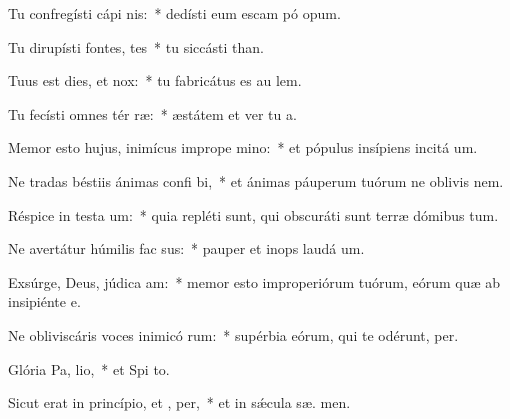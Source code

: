 \item Tu confregísti cápi nis:~* dedísti eum escam pó opum.
\item Tu dirupísti fontes,  tes~* tu siccásti  than.
\item Tuus est dies, et   nox:~* tu fabricátus es au  lem.
\item Tu fecísti omnes tér ræ:~* æstátem et ver tu  a.
\item Memor esto hujus, inimícus imprope mino:~* et pópulus insípiens incitá  um.
\item Ne tradas béstiis ánimas confi bi,~* et ánimas páuperum tuórum ne oblivis  nem.
\item Réspice in testa um:~* quia repléti sunt, qui obscuráti sunt terræ dómibus tum.
\item Ne avertátur húmilis fac sus:~* pauper et inops laudá  um.
\item Exsúrge, Deus, júdica  am:~* memor esto improperiórum tuórum, eórum quæ ab insipiénte   e.
\item Ne obliviscáris voces inimicó rum:~* supérbia eórum, qui te odérunt,  per.
\item Glória Pa,  lio,~* et Spi to.
\item Sicut erat in princípio, et ,  per,~* et in sǽcula sæ. men.
